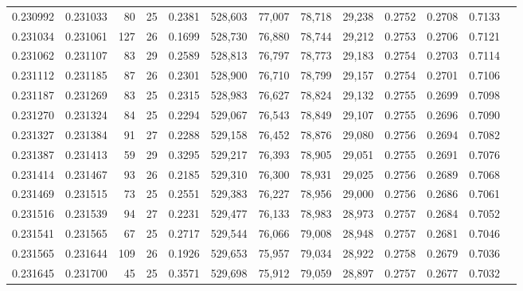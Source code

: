 \begin{tabular}{rrrrrrrrrrrrr}
0.230992 & 0.231033 &  80 &  25 &                                     0.2381 & 528,603 &  77,007 &  78,718 &  29,238 & 0.2752 & 0.2708 & 0.7133 \\
0.231034 & 0.231061 & 127 &  26 &                                     0.1699 & 528,730 &  76,880 &  78,744 &  29,212 & 0.2753 & 0.2706 & 0.7121 \\
0.231062 & 0.231107 &  83 &  29 &                                     0.2589 & 528,813 &  76,797 &  78,773 &  29,183 & 0.2754 & 0.2703 & 0.7114 \\
0.231112 & 0.231185 &  87 &  26 &                                     0.2301 & 528,900 &  76,710 &  78,799 &  29,157 & 0.2754 & 0.2701 & 0.7106 \\
0.231187 & 0.231269 &  83 &  25 &                                     0.2315 & 528,983 &  76,627 &  78,824 &  29,132 & 0.2755 & 0.2699 & 0.7098 \\
0.231270 & 0.231324 &  84 &  25 &                                     0.2294 & 529,067 &  76,543 &  78,849 &  29,107 & 0.2755 & 0.2696 & 0.7090 \\
0.231327 & 0.231384 &  91 &  27 &                                     0.2288 & 529,158 &  76,452 &  78,876 &  29,080 & 0.2756 & 0.2694 & 0.7082 \\
0.231387 & 0.231413 &  59 &  29 &                                     0.3295 & 529,217 &  76,393 &  78,905 &  29,051 & 0.2755 & 0.2691 & 0.7076 \\
0.231414 & 0.231467 &  93 &  26 &                                     0.2185 & 529,310 &  76,300 &  78,931 &  29,025 & 0.2756 & 0.2689 & 0.7068 \\
0.231469 & 0.231515 &  73 &  25 &                                     0.2551 & 529,383 &  76,227 &  78,956 &  29,000 & 0.2756 & 0.2686 & 0.7061 \\
0.231516 & 0.231539 &  94 &  27 &                                     0.2231 & 529,477 &  76,133 &  78,983 &  28,973 & 0.2757 & 0.2684 & 0.7052 \\
0.231541 & 0.231565 &  67 &  25 &                                     0.2717 & 529,544 &  76,066 &  79,008 &  28,948 & 0.2757 & 0.2681 & 0.7046 \\
0.231565 & 0.231644 & 109 &  26 &                                     0.1926 & 529,653 &  75,957 &  79,034 &  28,922 & 0.2758 & 0.2679 & 0.7036 \\
0.231645 & 0.231700 &  45 &  25 &                                     0.3571 & 529,698 &  75,912 &  79,059 &  28,897 & 0.2757 & 0.2677 & 0.7032 \\

\end{tabular}
